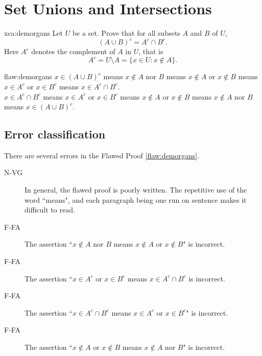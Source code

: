\section{Set Unions and Intersections}

\begin{xca}{xca:demorgans}
Let $U$ be a set.
Prove that for all subsets $A$ and $B$ of $U$, $$(A\cup B)^c = A^c \cap B^c.$$
Here $A^c$ denotes the complement of $A$ in $U$, that is $$A^c = U \setminus A = \{x \in U : x \notin A\}.$$
\end{xca}

\begin{flaw}{flaw:demorgans} 
$x \in (A\cup B)^c$ means $x \notin A$ nor $B$ means $x \notin A$ or $x \notin B$ means $x \in A^c $ or $x \in B^c$ means $x \in A^c \cap B^c$. \\

$x \in A^c \cap B^c$ means $x \in A^c $ or $x \in B^c$ means $x \notin A$ or $x \notin B$ means $x \notin A$ nor $B$ means $x \in (A\cup B)^c$. 

\end{flaw}

\clearpage
\subsection{Error classification}
There are several errors
 in the Flawed Proof \ref{flaw:demorgans}. 
 
 \begin{description}
    \item[N-VG] In general, the flawed proof is poorly written. The repetitive use of the word  ``means", and each paragraph being one run on sentence makes it difficult to read. 
    \item[F-FA] The assertion ``$x \notin A$ nor $B$ means $x \notin A$ or $x \notin B$" is incorrect.
    \item[F-FA] The assertion ``$x \in A^c$ or $x \in B^c$ means $x \in A^c \cap B^c$ is incorrect.
    \item[F-FA] The assertion ``$x \in A^c \cap B^c$ means $x \in A^c$ or $x \in B^c$" is incorrect.
    \item [F-FA] The assertion ``$x \notin A$ or $x \notin B$ means $x \notin A$ nor $B$" is incorrect. 
 \end{description}


